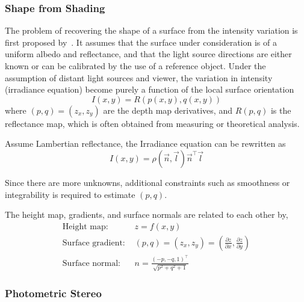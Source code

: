 \subsubsection{Shape from Shading}
The problem of recovering the shape of a surface from the intensity variation is first proposed by~\citeauthor{horn1989shape}. It assumes that the surface under consideration is of a uniform albedo and reflectance, and that the light source directions are either known or can be calibrated by the use of a reference object. Under the assumption of distant light sources and viewer, the variation in intensity (irradiance equation) become purely a function of the local surface orientation
$$
I(x, y) = R(p(x, y), q(x, y))
$$
where $(p, q) = (z_x, z_y)$ are the depth map derivatives, and $R(p, q)$ is the reflectance map, which is often obtained from measuring or theoretical analysis.

Assume Lambertian reflectance, the Irradiance equation can be rewritten as
$$
I(x, y) = \rho(\vec{n},\vec{l})\vec{n}^\top\vec{l}
$$

Since there are more unknowns, additional constraints such as smoothness or integrability is required to estimate $(p, q)$.

The height map, gradients, and surface normals are related to each other by,
\begin{align*}
\text{Height map: } & z=f(x,y)\\
\text{Surface gradient: } & (p,q)=(z_x,z_y)=(\frac{\partial z}{\partial x}, \frac{\partial z}{\partial y})\\
\text{Surface normal: } & n = \frac{(-p, -q, 1)^\top}{\sqrt{p^2+q^2+1}}
\end{align*}

\subsubsection{Photometric Stereo}

